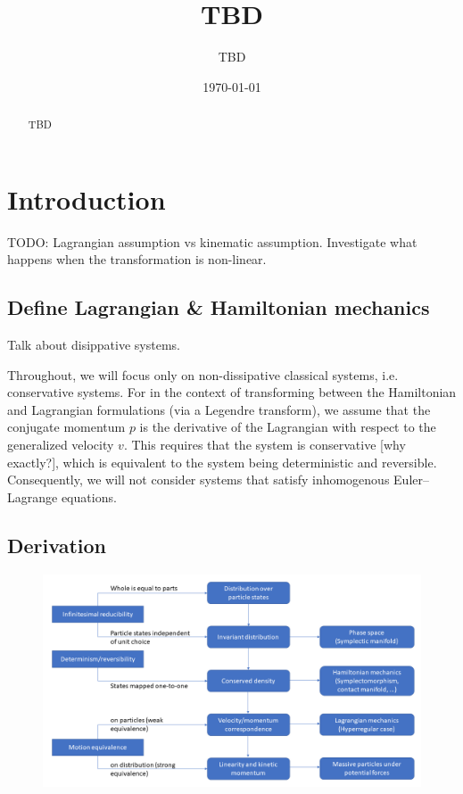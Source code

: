\documentclass[letterpaper]{article}
\begin{document}

\title{TBD}
\author{TBD}

\date{\today}

\maketitle

\begin{abstract}
	TBD
\end{abstract}


\section{Introduction}


TODO: Lagrangian assumption vs kinematic assumption. Investigate what happens when the transformation is non-linear.

\subsection{Define Lagrangian \& Hamiltonian mechanics}

Talk about disippative systems.

Throughout, we will focus only on non-dissipative classical systems, i.e. conservative systems. For in the context of transforming between the Hamiltonian and Lagrangian formulations (via a Legendre transform), we assume that the conjugate momentum $p$ is the derivative of the Lagrangian with respect to the generalized velocity $v $. This requires that the system is conservative [why exactly?], which is equivalent to the system being deterministic and reversible. Consequently, we will not consider systems that satisfy inhomogenous Euler--Lagrange equations.

\subsection{Derivation}

\begin{figure}[h]
	\centering
	\includegraphics[width=\textwidth]{Diagram.png}
\end{figure}
\end{document}
